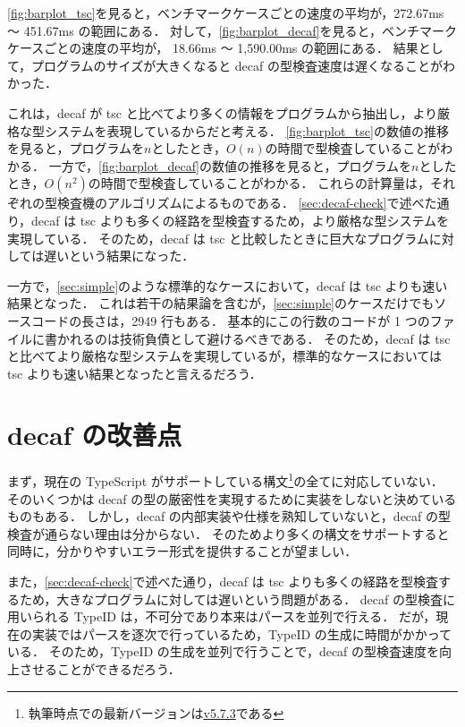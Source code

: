 \ref{fig:barplot_tsc}を見ると，ベンチマークケースごとの速度の平均が，272.67ms 〜 451.67ms の範囲にある．
対して，\ref{fig:barplot_decaf}を見ると，ベンチマークケースごとの速度の平均が， 18.66ms 〜 1,590.00ms の範囲にある．
結果として，プログラムのサイズが大きくなると decaf の型検査速度は遅くなることがわかった．

これは，decaf が tsc と比べてより多くの情報をプログラムから抽出し，より厳格な型システムを表現しているからだと考える．
\ref{fig:barplot_tsc}の数値の推移を見ると，プログラムを$n$としたとき，$O(n)$の時間で型検査していることがわかる．
一方で，\ref{fig:barplot_decaf}の数値の推移を見ると，プログラムを$n$としたとき，$O(n^2)$の時間で型検査していることがわかる．
これらの計算量は，それぞれの型検査機のアルゴリズムによるものである．
\ref{sec:decaf-check}で述べた通り，decaf は tsc よりも多くの経路を型検査するため，より厳格な型システムを実現している．
そのため，decaf は tsc と比較したときに巨大なプログラムに対しては遅いという結果になった．

一方で，\ref{sec:simple}のような標準的なケースにおいて，decaf は tsc よりも速い結果となった．
これは若干の結果論を含むが，\ref{sec:simple}のケースだけでもソースコードの長さは，2949 行もある．
基本的にこの行数のコードが 1 つのファイルに書かれるのは技術負債として避けるべきである．
そのため，decaf は tsc と比べてより厳格な型システムを実現しているが，標準的なケースにおいては tsc よりも速い結果となったと言えるだろう．

\section{decaf の改善点}

まず，現在の TypeScript がサポートしている構文\footnote{執筆時点での最新バージョンは\href{https://github.com/microsoft/TypeScript/tree/v5.7.3}{v5.7.3}である}の全てに対応していない．
そのいくつかは decaf の型の厳密性を実現するために実装をしないと決めているものもある．
しかし，decaf の内部実装や仕様を熟知していないと，decaf の型検査が通らない理由は分からない．
そのためより多くの構文をサポートすると同時に，分かりやすいエラー形式を提供することが望ましい．

また，\ref{sec:decaf-check}で述べた通り，decaf は tsc よりも多くの経路を型検査するため，大きなプログラムに対しては遅いという問題がある．
decaf の型検査に用いられる TypeID は，不可分であり本来はパースを並列で行える．
だが，現在の実装ではパースを逐次で行っているため，TypeID の生成に時間がかかっている．
そのため，TypeID の生成を並列で行うことで，decaf の型検査速度を向上させることができるだろう．
